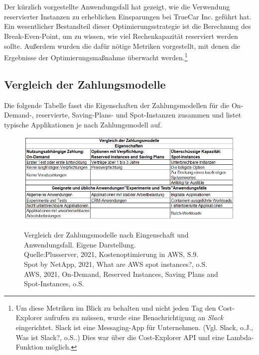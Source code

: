 \\\\
Der kürzlich vorgestellte Anwendungsfall hat gezeigt, wie die Verwendung reservierter Instanzen zu erheblichen Einsparungen bei TrueCar Inc. geführt hat. Ein wesentlicher Bestandteil dieser Optimierungsstrategie ist die Berechnung des Break-Even-Point, um zu wissen, wie viel Rechenkapazität reserviert werden sollte. Außerdem wurden die dafür nötige Metriken vorgestellt, mit denen die Ergebnisse der Optimierungsmaßnahme überwacht werden.\footnote{Um diese Metriken im Blick zu behalten und nicht jeden Tag den Cost-Explorer aufrufen zu müssen, wurde eine Benachrichtigung an \textit{Slack} eingerichtet. Slack ist eine Messaging-App für Unternehmen. (Vgl. Slack, o.J., Was ist Slack?, o.S.\cite{SLACK}.) Dies war über die Cost-Explorer API und eine Lambda-Funktion möglich.} 

\subsection*{Vergleich der Zahlungsmodelle}
Die folgende Tabelle fasst die Eigenschaften der Zahlungsmodellen für die On-Demand-, reservierte, Saving-Plans- und Spot-Instanzen zusammen und listet typische Applikationen je nach Zahlungsmodell auf.
\begin{figure}[h!]
    \centering
    \includegraphics[scale=0.7]{sources/Vergleich_der_Zahlungsmodelle}\label{fig:Vergleich_der_Zahlungsmodelle}\\
    \caption[Vergleich der Zahlungsmodelle]{}
    \begin{footnotesize}   
    \label{fig:Vergleich_der_Zahlungsmodelle}  Vergleich der Zahlungsmodelle nach Eingenschaft und Anwendungsfall. Eigene Darstellung.\\
Quelle:Plusserver, 2021, Kostenoptimierung in AWS, S.9.\cite{PS1}\\
Spot by NetApp, 2021, What are AWS spot instances?, o.S.\cite{SPOT1}\\
AWS, 2021, On-Demand, Reserved Instances, Saving Plans and Spot-Instances, o.S.\cite{AMZ02, AMZ07, AMZ11, AMZ19}
\end{footnotesize}
\end{figure}
%

